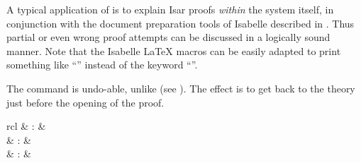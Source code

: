 \begin{isabellebody}
\begin{isamarkuptext}
  A typical application of \hyperlink{command.oops}{\mbox{}} is to explain Isar proofs
  \emph{within} the system itself, in conjunction with the document
  preparation tools of Isabelle described in .
  Thus partial or even wrong proof attempts can be discussed in a
  logically sound manner.  Note that the Isabelle {\LaTeX} macros can
  be easily adapted to print something like ``'' instead of
  the keyword ``\hyperlink{command.oops}{\mbox{}}''.

  \medskip The \hyperlink{command.oops}{\mbox{}} command is undo-able, unlike
  \hyperlink{command.kill}{\mbox{}} (see ).  The effect is to
  get back to the theory just before the opening of the proof.%
\end{isamarkuptext}%
\isamarkuptrue%
%
\isamarkuptrue%
%
\isamarkuptrue%
%
\begin{isamarkuptext}%
\begin{matharray}{rcl}
    \hypertarget{command.fix}{\hyperlink{command.fix}{\mbox{}}} & : &  \\
    \hypertarget{command.assume}{\hyperlink{command.assume}{\mbox{}}} & : &  \\
    \hypertarget{command.presume}{\hyperlink{command.presume}{\mbox{}}} & : &  \\

\end{matharray}
\end{isamarkuptext}
\end{isabellebody}
